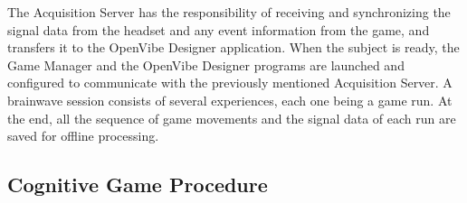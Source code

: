 \documentclass[journal]{IEEEtran}
\begin{document}
The Acquisition Server has the responsibility of receiving and synchronizing the signal data from the headset and any event information from the game, and transfers it to the OpenVibe Designer application. When the subject is ready, the Game Manager and the OpenVibe Designer programs are launched and configured to communicate with the previously mentioned Acquisition Server. A brainwave session consists of several experiences, each one being a game run.  At the end, all the sequence of game movements and the signal data of each run are saved for offline processing.


\subsection{Cognitive Game Procedure}
\label{cognitive_experiment_details}
\end{document}
